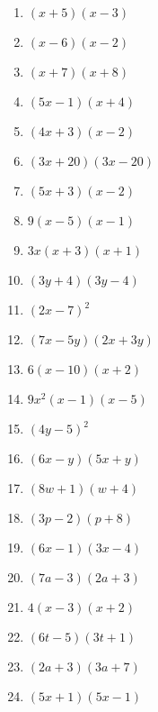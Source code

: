 \begin{multicols}{4}
\begin{enumerate}
\item $(x + 5)(x-3)$
\item $(x-6)(x-2)$
\item $(x+7)(x+8)$
\item $(5x-1)(x+4)$
\item $(4x+3)(x-2)$
\item $(3x+20)(3x-20)$
\item $(5x+3)(x-2)$
\item $9(x-5)(x-1)$
\item $3x(x+3)(x+1)$
\item $(3y+4)(3y-4)$
\item $(2x-7)^2$
\item $(7x - 5y)(2x + 3y)$
\item $6(x-10)(x+2)$
\item $9x^2(x-1)(x-5)$
\item $(4y-5)^2$
\item $(6x-y)(5x+y)$
\item $(8w+1)(w+4)$
\item $(3p-2)(p+8)$
\item $(6x-1)(3x-4)$
\item $(7a-3)(2a+3)$
\item $4(x-3)(x+2)$
\item $(6t-5)(3t+1)$
\item $(2a+3)(3a+7)$
\item $(5x+1)(5x-1)$
\end{enumerate}
\end{multicols}